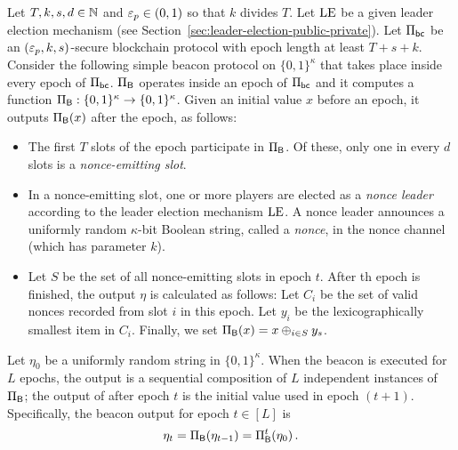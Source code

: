 \begin{definition}\label{def:new-beacon}
  Let $T, k, s,d \in \mathbb{N}$ and $\mathsf{\varepsilon}_p \in (0,1)$ 
  so that $k$ divides $T$.
  Let $\mathrm{LE}$ be a given leader election mechanism 
  (see Section~\ref{sec:leader-election-public-private}).
  Let $\Pi_\mathsf{bc}$ be an $(\mathsf{\varepsilon}_p, k, s)$-secure blockchain protocol 
  with epoch length at least $T + s + k$. 
  Consider the following simple beacon protocol on $\{0,1\}^\kappa$ 
  that takes place inside every epoch of $\Pi_\mathsf{bc}$. 
  $\Pi_{\mathsf{B}}$ operates inside an epoch of $\Pi_\mathsf{bc}$ 
  and it computes a function 
  $\Pi_{\mathsf{B}} : \{0,1\}^\kappa \rightarrow \{0,1\}^\kappa$. 
  Given an initial value $x$ before an epoch, 
  it outputs $\Pi_{\mathsf{B}}(x)$ 
  after the epoch, as follows:
  \begin{itemize}
    \item The first $T$ slots of the epoch participate in $\Pi_{\mathsf{B}}$. 
    Of these, only one in every $d$ slots is a \emph{nonce-emitting slot}. 

    \item In a nonce-emitting slot, one or more players are elected as a \emph{nonce leader} 
    according to the leader election mechanism $\mathrm{LE}$.
    A nonce leader announces a uniformly random $\kappa$-bit Boolean string, 
    called a \emph{nonce},  
    in the nonce channel (which has parameter $k$). 

    \item 
    Let $S$ be the set of all nonce-emitting slots in epoch $t$.
    After th epoch is finished, the output $\eta$ is calculated as follows:
    Let $C_i$ be the set of valid nonces recorded from slot $i$ in this epoch. 
    Let $y_i$ be the lexicographically smallest item in $C_i$.
    Finally, we set $\Pi_{\mathsf{B}}(x) = x \oplus_{i \in S} y_s$.
  \end{itemize}
  Let $\eta_0$ be a uniformly random string in $\{0,1\}^\kappa$. 
  When the beacon is executed for $L$ epochs, 
  the output is a sequential composition of 
  $L$ independent instances of $\Pi_{\mathsf{B}}$; 
  the output of after epoch $t$ is the initial value used in epoch $(t+1)$. 
  Specifically, 
  the beacon output for epoch $t \in [L]$ is 
  \begin{align}%
    \eta_t = \Pi_\Beacon(\eta_{t-1}) = \Pi_\Beacon^t(\eta_0)\,.
  \end{align}
\end{definition}












